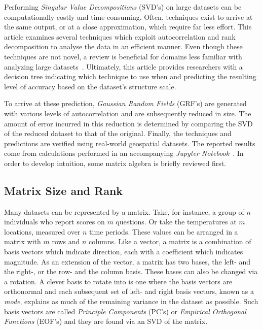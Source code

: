 \documentclass[ijgi,article,submit,moreauthors,pdftex,10pt,a4paper]{Definitions/mdpi}
\begin{document}
Performing \textit{Singular Value Decompositions} (SVD's) on large datasets can be computationally costly and time consuming. Often, techniques exist to arrive at the same output, or at a close approximation, which require far less effort. This article examines several techniques which exploit autocorrelation and rank decomposition to analyse the data in an efficient manner. Even though these techniques are not novel, a review is beneficial for domains less familiar with analyzing large datasets~\cite{Golub1970, Bjorck1973, Chan1982}. Ultimately, this article provides researchers with a decision tree indicating which technique to use when and predicting the resulting level of accuracy based on the dataset's structure scale.

To arrive at these prediction, \textit{Gaussian Random Fields} (GRF's) are generated with various levels of autocorrelation and are subsequently reduced in size. The amount of error incurred in this reduction is determined by comparing the SVD of the reduced dataset to that of the original. Finally, the techniques and predictions are verified using real-world geospatial datasets. The reported results come from calculations performed in an accompanying \textit{Jupyter Notebook}~\cite{Bogaardt2018}. In order to develop intuition, some matrix algebra is briefly reviewed first.

\subsection{Matrix Size and Rank}
\label{sec:Introduction/Matrix Size and Rank}

Many datasets can be represented by a matrix. Take, for instance, a group of $n$ individuals who report scores on $m$ questions. Or take the temperatures at $m$ locations, measured over $n$ time periods. These values can be arranged in a matrix with $m$ rows and $n$ columns. Like a vector, a matrix is a combination of basis vectors which indicate direction, each with a coefficient which indicates magnitude. As an extension of the vector, a matrix has two bases, the left- and the right-, or the row- and the column basis. These bases can also be changed via a rotation. A clever basis to rotate into is one where the basis vectors are orthonormal and each subsequent set of left- and right basis vectors, known as a \textit{mode}, explains as much of the remaining variance in the dataset as possible. Such basis vectors are called \textit{Principle Components} (PC's) or \textit{Empirical Orthogonal Functions} (EOF's) and they are found via an SVD of the matrix.
\end{document}
